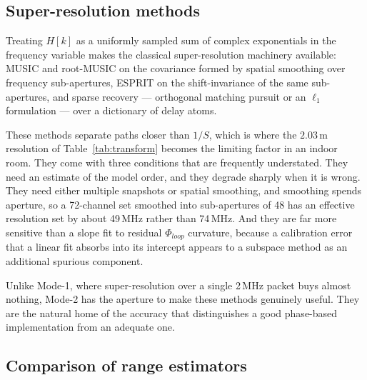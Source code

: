\documentclass[11pt,a4paper]{article}
\begin{document}
\subsection{Super-resolution methods}
\label{sec:superres}

Treating $H[k]$ as a uniformly sampled sum of complex exponentials in the frequency variable makes
the classical super-resolution machinery available: MUSIC and root-MUSIC on the covariance formed by
spatial smoothing over frequency sub-apertures, ESPRIT on the shift-invariance of the same
sub-apertures, and sparse recovery --- orthogonal matching pursuit or an $\ell_1$ formulation --- over
a dictionary of delay atoms.

These methods separate paths closer than $1/S$, which is where the $2.03$\,m resolution of
Table~\ref{tab:transform} becomes the limiting factor in an indoor room. They come with three
conditions that are frequently understated. They need an estimate of the model order, and they
degrade sharply when it is wrong. They need either multiple snapshots or spatial smoothing, and
smoothing spends aperture, so a 72-channel set smoothed into sub-apertures of 48 has an effective
resolution set by about 49\,MHz rather than 74\,MHz. And they are far more sensitive than a slope fit to
residual $\Phi_{loop}$ curvature, because a calibration error that a linear fit absorbs into its
intercept appears to a subspace method as an additional spurious component.

Unlike Mode-1, where super-resolution over a single 2\,MHz packet buys almost nothing, Mode-2 has
the aperture to make these methods genuinely useful. They are the natural home of the accuracy that
distinguishes a good phase-based implementation from an adequate one.

\subsection{Comparison of range estimators}
\end{document}
